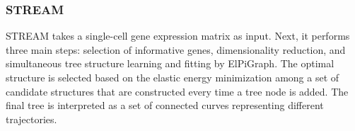 \subsubsection{STREAM}
STREAM takes a single-cell gene expression matrix as input. Next, it performs three main steps: selection of informative genes, dimensionality reduction, and simultaneous tree structure learning and fitting by ElPiGraph. The optimal structure is selected based on the elastic energy minimization among a set of candidate structures that are constructed every time a tree node is added. The final tree is interpreted as a set of connected curves representing different trajectories. 

